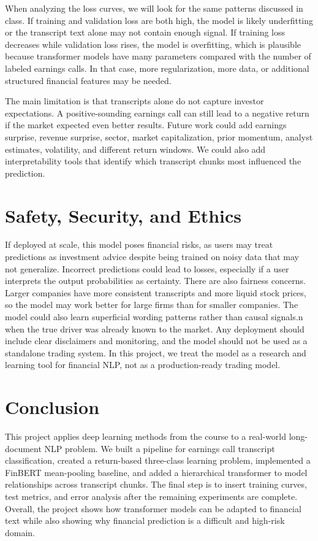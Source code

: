 \documentclass[11pt]{article}
\begin{document}
When analyzing the loss curves, we will look for the same patterns discussed in class. If training and validation loss are both high, the model is likely underfitting or the transcript text alone may not contain enough signal. If training loss decreases while validation loss rises, the model is overfitting, which is plausible because transformer models have many parameters compared with the number of labeled earnings calls. In that case, more regularization, more data, or additional structured financial features may be needed.

The main limitation is that transcripts alone do not capture investor expectations. A positive-sounding earnings call can still lead to a negative return if the market expected even better results. Future work could add earnings surprise, revenue surprise, sector, market capitalization, prior momentum, analyst estimates, volatility, and different return windows. We could also add interpretability tools that identify which transcript chunks most influenced the prediction.

\section{Safety, Security, and Ethics}

If deployed at scale, this model poses financial risks, as users may treat predictions as investment advice despite being trained on noisy data that may not generalize. Incorrect predictions could lead to losses, especially if a user interprets the output probabilities as certainty. There are also fairness concerns. Larger companies have more consistent transcripts and more liquid stock prices, so the model may work better for large firms than for smaller companies. The model could also learn superficial wording patterns rather than causal signals.n when the true driver was already known to the market. Any deployment should include clear disclaimers and monitoring, and the model should not be used as a standalone trading system. In this project, we treat the model as a research and learning tool for financial NLP, not as a production-ready trading model.
\section{Conclusion}

This project applies deep learning methods from the course to a real-world long-document NLP problem. We built a pipeline for earnings call transcript classification, created a return-based three-class learning problem, implemented a FinBERT mean-pooling baseline, and added a hierarchical transformer to model relationships across transcript chunks. The final step is to insert training curves, test metrics, and error analysis after the remaining experiments are complete. Overall, the project shows how transformer models can be adapted to financial text while also showing why financial prediction is a difficult and high-risk domain.
\end{document}
